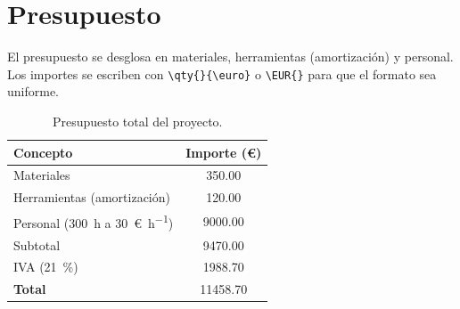 \chapter{Presupuesto}\label{anx:presupuesto}

El presupuesto se desglosa en materiales, herramientas (amortización) y
personal. Los importes se escriben con \verb|\qty{}{\euro}| o \verb|\EUR{}|
para que el formato sea uniforme.

\begin{table}[H]
  \centering
  \caption{Presupuesto total del proyecto.}
  \label{tab:presupuesto}
  \begin{tabular}{lS[table-format=5.2]}
    \toprule
    Concepto & {Importe (\euro)} \\
    \midrule
    Materiales                 &   350.00 \\
    Herramientas (amortización) &   120.00 \\
    Personal (\qty{300}{\hour} a \qty{30}{\euro\per\hour}) & 9000.00 \\
    \midrule
    Subtotal                   &  9470.00 \\
    IVA (\qty{21}{\percent})   &  1988.70 \\
    \midrule
    \textbf{Total}             & 11458.70 \\
    \bottomrule
  \end{tabular}
\end{table}
